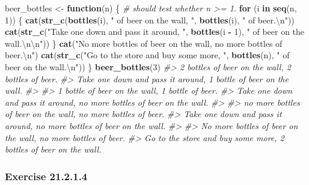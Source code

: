 \documentclass[]{book}
\newenvironment{Shaded}{\begin{snugshade}}{\end{snugshade}}
\newcommand{\CharTok}[1]{\textcolor[rgb]{0.31,0.60,0.02}{#1}}
\newcommand{\CommentTok}[1]{\textcolor[rgb]{0.56,0.35,0.01}{\textit{#1}}}
\newcommand{\ControlFlowTok}[1]{\textcolor[rgb]{0.13,0.29,0.53}{\textbf{#1}}}
\newcommand{\DecValTok}[1]{\textcolor[rgb]{0.00,0.00,0.81}{#1}}
\newcommand{\KeywordTok}[1]{\textcolor[rgb]{0.13,0.29,0.53}{\textbf{#1}}}
\newcommand{\NormalTok}[1]{#1}
\newcommand{\OperatorTok}[1]{\textcolor[rgb]{0.81,0.36,0.00}{\textbf{#1}}}
\newcommand{\StringTok}[1]{\textcolor[rgb]{0.31,0.60,0.02}{#1}}
\theoremstyle{plain}
\theoremstyle{remark}
\begin{document}
\begin{enumerate}
\begin{Shaded}
\begin{Highlighting}[]
\NormalTok{beer_bottles <-}\StringTok{ }\ControlFlowTok{function}\NormalTok{(n) \{}
  \CommentTok{# should test whether n >= 1.}
  \ControlFlowTok{for}\NormalTok{ (i }\ControlFlowTok{in} \KeywordTok{seq}\NormalTok{(n, }\DecValTok{1}\NormalTok{)) \{}
     \KeywordTok{cat}\NormalTok{(}\KeywordTok{str_c}\NormalTok{(}\KeywordTok{bottles}\NormalTok{(i), }\StringTok{" of beer on the wall, "}\NormalTok{, }\KeywordTok{bottles}\NormalTok{(i), }\StringTok{" of beer.}\CharTok{\textbackslash{}n}\StringTok{"}\NormalTok{))}
     \KeywordTok{cat}\NormalTok{(}\KeywordTok{str_c}\NormalTok{(}\StringTok{"Take one down and pass it around, "}\NormalTok{, }\KeywordTok{bottles}\NormalTok{(i }\OperatorTok{-}\StringTok{ }\DecValTok{1}\NormalTok{),}
                \StringTok{" of beer on the wall.}\CharTok{\textbackslash{}n\textbackslash{}n}\StringTok{"}\NormalTok{))}
\NormalTok{  \}}
  \KeywordTok{cat}\NormalTok{(}\StringTok{"No more bottles of beer on the wall, no more bottles of beer.}\CharTok{\textbackslash{}n}\StringTok{"}\NormalTok{)}
  \KeywordTok{cat}\NormalTok{(}\KeywordTok{str_c}\NormalTok{(}\StringTok{"Go to the store and buy some more, "}\NormalTok{, }\KeywordTok{bottles}\NormalTok{(n), }\StringTok{" of beer on the wall.}\CharTok{\textbackslash{}n}\StringTok{"}\NormalTok{))}
\NormalTok{\}}
\KeywordTok{beer_bottles}\NormalTok{(}\DecValTok{3}\NormalTok{)}
\CommentTok{#> 2 bottles of beer on the wall, 2 bottles of beer.}
\CommentTok{#> Take one down and pass it around, 1 bottle of beer on the wall.}
\CommentTok{#> }
\CommentTok{#> 1 bottle of beer on the wall, 1 bottle of beer.}
\CommentTok{#> Take one down and pass it around, no more bottles of beer on the wall.}
\CommentTok{#> }
\CommentTok{#> no more bottles of beer on the wall, no more bottles of beer.}
\CommentTok{#> Take one down and pass it around, no more bottles of beer on the wall.}
\CommentTok{#> }
\CommentTok{#> No more bottles of beer on the wall, no more bottles of beer.}
\CommentTok{#> Go to the store and buy some more, 2 bottles of beer on the wall.}
\end{Highlighting}
\end{Shaded}
\end{enumerate}

\hypertarget{exercise-21.2.1.4}{%
\subsubsection*{\texorpdfstring{Exercise {21.2.1.4}}{Exercise 21.2.1.4}}\label{exercise-21.2.1.4}}
\end{document}
